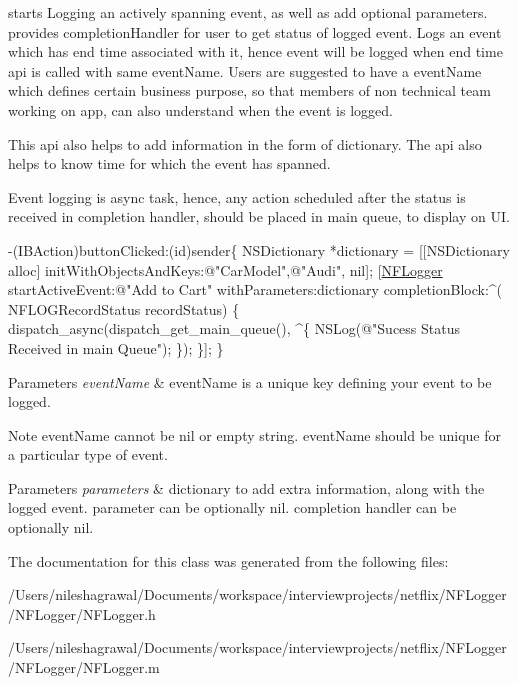 starts Logging an actively spanning event, as well as add optional parameters. provides completion\+Handler for user to get status of logged event. Logs an event which has end time associated with it, hence event will be logged when end time api is called with same event\+Name. Users are suggested to have a event\+Name which defines certain business purpose, so that members of non technical team working on app, can also understand when the event is logged. 

This api also helps to add information in the form of dictionary. The api also helps to know time for which the event has spanned.

Event logging is async task, hence, any action scheduled after the status is received in completion handler, should be placed in main queue, to display on UI.


\begin{DoxyCode}
-(IBAction)buttonClicked:(\textcolor{keywordtype}{id})sender\{
 NSDictionary *dictionary = [[NSDictionary alloc] initWithObjectsAndKeys:\textcolor{stringliteral}{@"CarModel"},\textcolor{stringliteral}{@"Audi"}, nil];
 [\hyperlink{interface_n_f_logger}{NFLogger} startActiveEvent:\textcolor{stringliteral}{@"Add to Cart"} withParameters:dictionary completionBlock:^(
      NFLOGRecordStatus recordStatus) \{
      dispatch\_async(dispatch\_get\_main\_queue(), ^\{
          NSLog(\textcolor{stringliteral}{@"Sucess Status Received in main Queue"});
       \});
  \}];
\}
\end{DoxyCode}
 
\begin{DoxyParams}{Parameters}
{\em event\+Name} & event\+Name is a unique key defining your event to be logged. \\
\hline
\end{DoxyParams}
\begin{DoxyNote}{Note}
event\+Name cannot be nil or empty string. event\+Name should be unique for a particular type of event. 
\end{DoxyNote}

\begin{DoxyParams}{Parameters}
{\em parameters} & dictionary to add extra information, along with the logged event. parameter can be optionally nil. completion handler can be optionally nil. \\
\hline
\end{DoxyParams}


The documentation for this class was generated from the following files\+:\begin{DoxyCompactItemize}
\item 
/\+Users/nileshagrawal/\+Documents/workspace/interviewprojects/netflix/\+N\+F\+Logger/\+N\+F\+Logger/N\+F\+Logger.\+h\item 
/\+Users/nileshagrawal/\+Documents/workspace/interviewprojects/netflix/\+N\+F\+Logger/\+N\+F\+Logger/N\+F\+Logger.\+m\end{DoxyCompactItemize}
